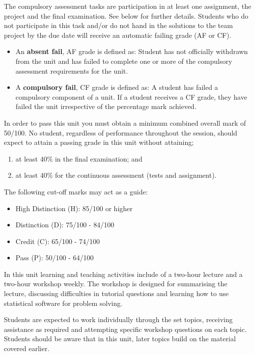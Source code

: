 \documentclass[a4paper,oneside]{book}
\begin{document}
The compulsory assessment tasks are participation in at least one
assignment, the project and the final examination. See
below for further details. Students who do not participate in this
task and/or do not hand in the solutions to the team project by the
due date will receive an automatic failing grade (AF or CF).
\begin{itemize}

\item An \textbf{absent fail}, AF grade is defined as: Student has not
officially withdrawn from the unit and has failed to complete one or
more of the compulsory assessment requirements for the unit.

\item A \textbf{compulsory fail}, CF grade is defined as: A student has
failed a compulsory component of a unit. If a student receives a CF
grade, they have failed the unit irrespective of the percentage mark
achieved.
\end{itemize}
In order to pass this unit you must obtain a minimum combined overall
mark of 50/100. No student, regardless of performance throughout the
session, should expect to attain a passing grade in this unit without
attaining;
\begin{enumerate}
\item at least 40\% in the final examination; and
\item at least 40\% for the continuous assessment (tests and
  assignment).
\end{enumerate}
The following cut-off marks may act as a guide:
\begin{itemize}
\item High Distinction (H):            85/100 or higher
\item Distinction (D):                 75/100 - 84/100
\item Credit (C):                      65/100 - 74/100
\item Pass (P):                        50/100 - 64/100
\end{itemize}
In this unit learning and teaching activities include of a two-hour
lecture and a two-hour workshop weekly. The workshop is designed for
summarising the lecture, discussing difficulties in tutorial questions
and learning how to use statistical software for problem
solving. 

Students are expected to work individually through the set topics,
receiving assistance as required and attempting specific workshop
questions on each topic. Students should be aware that in this unit,
later topics build on the material covered earlier.
\end{document}
